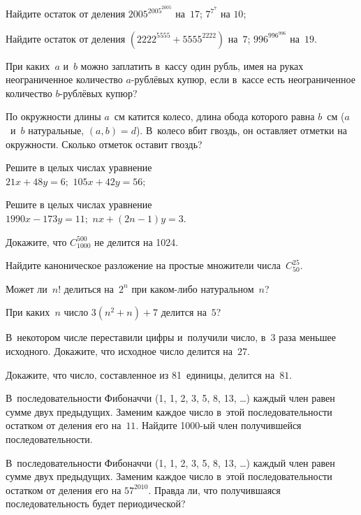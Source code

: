 \documentclass[a4paper,12pt]{article}
\begin{document}
Найдите остаток от деления
 $2005^{2005^{2005}}$ на~$17$;
 $7^{7^7}$ на $10$;

Найдите остаток от деления
 $(2222^{5555}+5555^{2222})$ на~$7$;
 $996^{996^{996}}$ на~$19$.

При каких~$a$ и~$b$ можно заплатить в~кассу один рубль, имея на руках неограниченное количество $a$-рублёвых купюр, если в~кассе есть неограниченное количество $b$-рублёвых купюр?

По окружности длины $a$~см катится колесо, длина обода которого равна $b$~см ($a$~и~$b$ натуральные, $(a,b)=d$). В~колесо вбит гвоздь, он оставляет отметки на окружности. Сколько отметок оставит гвоздь?

Решите в целых числах уравнение\\
 $21x+48y=6;$
 $105x+42y=56;$

Решите в целых числах уравнение\\
 $1990x-173y=11;$
 $nx+(2n-1)y=3$.

Докажите, что $C_{1000}^{500}$  не делится на 1024.

Найдите каноническое разложение на простые множители числа~$C_{50}^{25}$.

Может ли~$n!$ делиться на~$2^n$ при каком-либо натуральном~$n$?

При каких~$n$ число $3(n^2+n)+7$ делится на~$5$?

В~некотором числе переставили цифры и~получили число, в~$3$ раза меньшее исходного. Докажите, что исходное число делится на~$27$.

Докажите, что число, составленное из 81~единицы, делится на~$81$.

В~последовательности Фибоначчи (1, 1, 2, 3, 5, 8, 13, \ldots) каждый член равен сумме двух предыдущих. Заменим каждое число в~этой последовательности остатком от деления его на~$11$. Найдите 1000-ый член получившейся последовательности.

В~последовательности Фибоначчи (1, 1, 2, 3, 5, 8, 13, \ldots) каждый член равен сумме двух предыдущих. Заменим каждое число в~этой последовательности остатком от деления его на $57^{2010}$. Правда ли, что получившаяся последовательность будет периодической?
\end{document}
